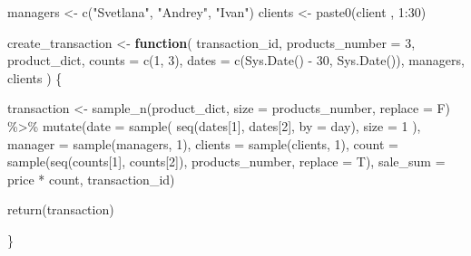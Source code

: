 \documentclass[
]{book}
\newenvironment{Shaded}{\begin{snugshade}}{\end{snugshade}}
\newcommand{\AttributeTok}[1]{\textcolor[rgb]{0.77,0.63,0.00}{#1}}
\newcommand{\ControlFlowTok}[1]{\textcolor[rgb]{0.13,0.29,0.53}{\textbf{#1}}}
\newcommand{\DecValTok}[1]{\textcolor[rgb]{0.00,0.00,0.81}{#1}}
\newcommand{\FunctionTok}[1]{\textcolor[rgb]{0.00,0.00,0.00}{#1}}
\newcommand{\NormalTok}[1]{#1}
\newcommand{\OtherTok}[1]{\textcolor[rgb]{0.56,0.35,0.01}{#1}}
\newcommand{\SpecialCharTok}[1]{\textcolor[rgb]{0.00,0.00,0.00}{#1}}
\newcommand{\StringTok}[1]{\textcolor[rgb]{0.31,0.60,0.02}{#1}}
\begin{document}
\begin{Shaded}
\begin{Highlighting}[]
\NormalTok{managers }\OtherTok{\textless{}{-}} \FunctionTok{c}\NormalTok{(}\StringTok{"Svetlana"}\NormalTok{, }\StringTok{"Andrey"}\NormalTok{, }\StringTok{"Ivan"}\NormalTok{)}
\NormalTok{clients  }\OtherTok{\textless{}{-}} \FunctionTok{paste0}\NormalTok{(}\StringTok{\textquotesingle{}client \textquotesingle{}}\NormalTok{, }\DecValTok{1}\SpecialCharTok{:}\DecValTok{30}\NormalTok{)}

\NormalTok{create\_transaction }\OtherTok{\textless{}{-}} \ControlFlowTok{function}\NormalTok{(}
\NormalTok{  transaction\_id,}
  \AttributeTok{products\_number =} \DecValTok{3}\NormalTok{,}
\NormalTok{  product\_dict,}
  \AttributeTok{counts =} \FunctionTok{c}\NormalTok{(}\DecValTok{1}\NormalTok{, }\DecValTok{3}\NormalTok{),}
  \AttributeTok{dates =} \FunctionTok{c}\NormalTok{(}\FunctionTok{Sys.Date}\NormalTok{() }\SpecialCharTok{{-}} \DecValTok{30}\NormalTok{, }\FunctionTok{Sys.Date}\NormalTok{()),}
\NormalTok{  managers,}
\NormalTok{  clients}
\NormalTok{) \{}

\NormalTok{  transaction }\OtherTok{\textless{}{-}} \FunctionTok{sample\_n}\NormalTok{(product\_dict, }\AttributeTok{size =}\NormalTok{ products\_number, }\AttributeTok{replace =}\NormalTok{ F) }\SpecialCharTok{\%\textgreater{}\%}
                  \FunctionTok{mutate}\NormalTok{(}\AttributeTok{date =} \FunctionTok{sample}\NormalTok{( }\FunctionTok{seq}\NormalTok{(dates[}\DecValTok{1}\NormalTok{], dates[}\DecValTok{2}\NormalTok{], }\AttributeTok{by =} \StringTok{\textquotesingle{}day\textquotesingle{}}\NormalTok{), }\AttributeTok{size =} \DecValTok{1}\NormalTok{ ),}
                         \AttributeTok{manager  =} \FunctionTok{sample}\NormalTok{(managers, }\DecValTok{1}\NormalTok{),}
                         \AttributeTok{clients  =} \FunctionTok{sample}\NormalTok{(clients, }\DecValTok{1}\NormalTok{),}
                         \AttributeTok{count    =} \FunctionTok{sample}\NormalTok{(}\FunctionTok{seq}\NormalTok{(counts[}\DecValTok{1}\NormalTok{], counts[}\DecValTok{2}\NormalTok{]), products\_number, }\AttributeTok{replace =}\NormalTok{ T),}
                         \AttributeTok{sale\_sum =}\NormalTok{ price }\SpecialCharTok{*}\NormalTok{ count,}
\NormalTok{                         transaction\_id)}

  \FunctionTok{return}\NormalTok{(transaction)}

\NormalTok{\}}


\end{Highlighting}
\end{Shaded}
\end{document}
